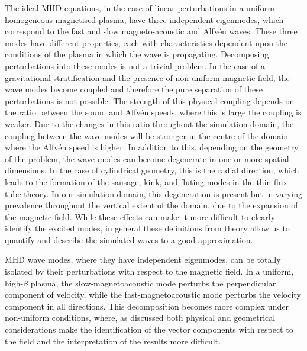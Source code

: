 The ideal MHD equations, in the case of linear perturbations in a uniform homogeneous magnetised plasma, have three independent eigenmodes, which correspond to the fast and slow magneto-acoustic and Alfv\'{e}n waves.
 These three modes have different properties, each with characteristics dependent upon the conditions of the plasma in which the wave is propagating. 
 Decomposing perturbations into these modes is not a trivial problem. 
 In the case of a gravitational stratification and the presence of non-uniform magnetic field, the wave modes become coupled and therefore the pure separation of these perturbations is not possible.
 The strength of this physical coupling depends on the ratio between the sound and Alfv\'en speeds, where this is large the coupling is weaker.
 Due to the changes in this ratio throughout the simulation domain, the coupling between the wave modes will be stronger in the centre of the domain where the Alfv\'en speed is higher.
 In addition to this, depending on the geometry of the problem, the wave modes can become degenerate in one or more spatial dimensions.
 In the case of cylindrical geometry, this is the radial direction, which leads to the formation of the sausage, kink, and fluting modes in the thin flux tube theory.
 In our simulation domain, this degeneration is present but in varying prevalence throughout the vertical extent of the domain, due to the expansion of the magnetic field.
 While these effects can make it more difficult to clearly identify the excited modes, in general these definitions from theory allow us to quantify and describe the simulated waves to a good approximation.

MHD wave modes, where they have independent eigenmodes, can be totally isolated by their perturbations with respect to the magnetic field.
 In a uniform, high-$\beta$ plasma, the slow-magnetoacoustic mode perturbs the perpendicular component of velocity, while the fast-magnetoacoustic mode perturbs the velocity component in all directions.
 This decomposition becomes more complex under non-uniform conditions, where, as discussed both physical and geometrical considerations make the identification of the vector components with respect to the field and the interpretation of the results more difficult.


